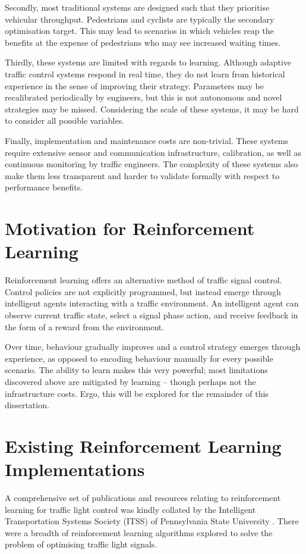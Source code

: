 \documentclass[a4paper]{report}
\begin{document}
Secondly, most traditional systems are designed such that they prioritise vehicular throughput. Pedestrians and cyclists are typically the secondary optimisation target. This may lead to scenarios in which vehicles reap the benefits at the expense of pedestrians who may see increased waiting times.

Thirdly, these systems are limited with regards to learning. Although adaptive traffic control systems respond in real time, they do not learn from historical experience in the sense of improving their strategy. Parameters may be recalibrated periodically by engineers, but this is not autonomous and novel strategies may be missed. Considering the scale of these systems, it may be hard to consider all possible variables.

Finally, implementation and maintenance costs are non-trivial. These systems require extensive sensor and communication infrastructure, calibration, as well as continuous monitoring by traffic engineers. The complexity of these systems also make them less transparent and harder to validate formally with respect to performance benefits.

\section{Motivation for Reinforcement Learning}

Reinforcement learning offers an alternative method of traffic signal control. Control policies are not explicitly programmed, but instead emerge through intelligent agents interacting with a traffic environment. An intelligent agent can observe current traffic state, select a signal phase action, and receive feedback in the form of a reward from the environment.

Over time, behaviour gradually improves and a control strategy emerges through experience, as opposed to encoding behaviour manually for every possible scenario. The ability to learn makes this very powerful; most limitations discovered above are mitigated by learning -- though perhaps not the infrastructure costs. Ergo, this will be explored for the remainder of this dissertation.

\section{Existing Reinforcement Learning Implementations}

A comprehensive set of publications and resources relating to reinforcement learning for traffic light control was kindly collated by the Intelligent Transportation Systems Society (ITSS) of Pennsylvania State University \cite{ITSS2020}. There were a breadth of reinforcement learning algorithms explored to solve the problem of optimising traffic light signals.
\end{document}
